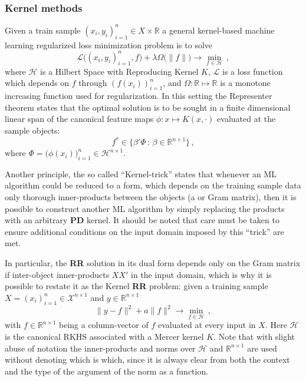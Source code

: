 \documentclass{ITaSconf}
\newcommand{\Hcal}{\mathcal{H}}
\newcommand{\Xcal}{\mathcal{X}}
\newcommand{\Real}{\mathbb{R}}
\newcommand{\Lcal}{\mathcal{L}}
\begin{document}

\subsubsection{Kernel methods} %
\label{ssub:kernel_methods}

Given a train sample $(x_i, y_i)_{i=1}^n \in X\times \Real$ a general kernel-based
machine learning regularized loss minimization problem is to solve
$$ \Lcal\bigl((x_i, y_i)_{i=1}^n, f\bigr)
  + \lambda \Omega\bigl(\|f\|\bigr)
  \to \min_{f\in \Hcal}\,, $$
where $\Hcal$ is a Hilbert Space with Reproducing Kernel $K$, $\Lcal$ is a loss
function which depends on $f$ through $(f(x_i))_{i=1}^n$, and $\Omega:\Real\mapsto\Real$
is a monotone increasing function used for regularization. In this setting the Representer
theorem states that the optimal solution is to be sought in a finite dimensional
linear span of the canonical feature maps $\phi: x\mapsto K(x, \cdot)$ evaluated at
the sample objects:
$$ f^* \in \bigl\{ \beta'\Phi\,:\, \beta \in \Real^{n\times 1} \bigr\} \,, $$
where $\Phi = \bigl(\phi(x_i)\bigr)_{i=1}^n \in \Hcal^{n\times 1}$.

Another principle, the so called ``Kernel-trick'' states that whenever an ML algorithm
could be reduced to a form, which depends on the training sample data only thorough
inner-products between the objects (a or Gram matrix), then it is possible to construct
another ML algorithm by simply replacing the products with an arbitrary \textbf{PD}
kernel. It should be noted that care must be taken to ensure additional conditions
on the input domain imposed by this ``trick'' are met.

In particular, the \textbf{RR} solution in its dual form depends only on the Gram
matrix if inter-object inner-products $X X'$ in the input domain, which is why it is
possible to restate it as the Kernel \textbf{RR} problem: given a training sample
$X = (x_i)_{i=1}^n\in\Xcal^{n\times 1}$ and $y\in\Real^{n\times 1}$
$$ \|y - f\|^2 + a \|f\|^2 \to \min_{f \in \Hcal} \,, $$
with $f \in \Real^{n\times 1}$ being a column-vector of $f$ evaluated at every input
in $X$. Here $\Hcal$ is the canonical RKHS associated with a Mercer kernel $K$. Note
that with slight abuse of notation the inner-products and norms over $\Hcal$ and
$\Real^{n\times 1}$ are used without denoting which is which, since it is always
clear from both the context and the type of the argument of the norm as a function.
\end{document}

